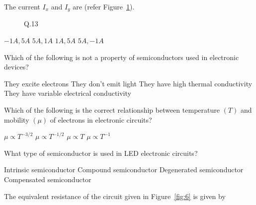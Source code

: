\documentclass[a4, 12pt, addpoints]{exam}
\begin{document}
\begin{questions}
\begin{oneparchoices}
\end{oneparchoices}
\question The current $I_x$ and $I_y$ are (refer Figure~\ref{fig:3}).
\begin{figure}[H]
\centering
{}
\caption{Q.13}
\label{fig:3}
\end{figure}
\begin{oneparchoices}
    \choice $-1A, 5A$
    \choice $ 5A, 1A$
    \choice $1A, 5A$
    \CorrectChoice $5A, -1A$
\end{oneparchoices}    
\question  Which of the following is not a property of semiconductors used in electronic devices?\\[0.3cm]
\begin{oneparchoices}
\choice They excite electrons
\choice They don't emit light
\choice They have high thermal conductivity
\choice They have variable electrical conductivity  
\end{oneparchoices}  
\question Which of the following is the correct relationship between temperature $(T)$ and mobility $(\mu)$ of electrons in electronic circuits?\\[0.3cm]
\begin{oneparchoices}
\choice $\mu \propto T^{-3/2} $
\choice $ \mu \propto T^{-1/2} $
\choice $ \mu \propto T $
\choice $ \mu \propto T^{-1} $  
\end{oneparchoices}  
\question What type of semiconductor is used in LED electronic circuits?\\[0.3cm]
\begin{oneparchoices}
\choice Intrinsic semiconductor
\choice Compound semiconductor
\choice Degenerated semiconductor
\choice Compensated semiconductor
\end{oneparchoices}
\question  The equivalent resistance of the circuit given in Figure~\ref{fig:6} is given by
\begin{figure}[H]
\centering
{}
\end{figure}
\end{questions}
\end{document}
